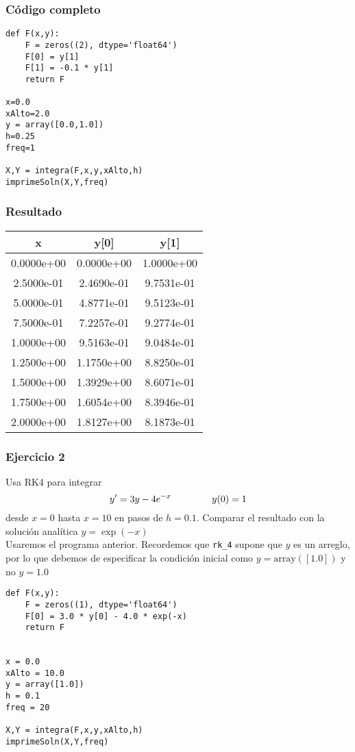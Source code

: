 \begin{frame}[fragile]
\frametitle{Código completo}
\begin{lstlisting}
def F(x,y):
    F = zeros((2), dtype='float64')
    F[0] = y[1]
    F[1] = -0.1 * y[1]
    return F

x=0.0
xAlto=2.0
y = array([0.0,1.0])
h=0.25
freq=1

X,Y = integra(F,x,y,xAlto,h)
imprimeSoln(X,Y,freq)
\end{lstlisting}
\end{frame}
\begin{frame}
\frametitle{Resultado}
\begin{center}
\begin{tabular}{c | c | c }
x & y[0] & y[1] \\ \hline 
   0.0000e+00 & 0.0000e+00 & 1.0000e+00 \\ \hline
   2.5000e-01 & 2.4690e-01 & 9.7531e-01 \\ \hline
   5.0000e-01 & 4.8771e-01 & 9.5123e-01 \\ \hline
   7.5000e-01 & 7.2257e-01 & 9.2774e-01 \\ \hline
   1.0000e+00 & 9.5163e-01 & 9.0484e-01 \\ \hline
   1.2500e+00 & 1.1750e+00 & 8.8250e-01 \\ \hline
   1.5000e+00 & 1.3929e+00 & 8.6071e-01 \\ \hline
   1.7500e+00 & 1.6054e+00 & 8.3946e-01 \\ \hline
   2.0000e+00 & 1.8127e+00 & 8.1873e-01
\end{tabular}
\end{center}
\end{frame}
\begin{frame}
\frametitle{Ejercicio 2}
Usa RK4 para integrar
\[ y' = 3y - 4 e^{-x} \hspace{1.5cm} y(0)=1 \]
desde $x=0$ hasta $x=10$ en pasos de $h=0.1$. Comparar el resultado con la solución analítica $y=\exp(-x)$
\\
\bigskip
Usaremos el programa anterior. Recordemos que \texttt{rk\_4} supone que $y$ es un arreglo, por lo que debemos de especificar la condición inicial como $y=\text{array}([1.0])$ y no $y=1.0$
\end{frame}
\begin{frame}[fragile]
\begin{lstlisting}
def F(x,y):
    F = zeros((1), dtype='float64')
    F[0] = 3.0 * y[0] - 4.0 * exp(-x)
    return F


x = 0.0
xAlto = 10.0
y = array([1.0])
h = 0.1
freq = 20

X,Y = integra(F,x,y,xAlto,h)
imprimeSoln(X,Y,freq)
\end{lstlisting}
\end{frame}
